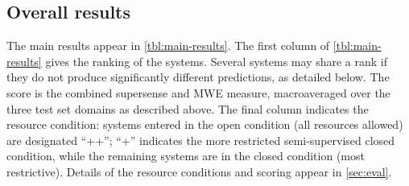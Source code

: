 \documentclass[11pt,letterpaper]{article}
\begin{document}
\subsection{Overall results}\label{sec:overall}
The main results appear in \cref{tbl:main-results}. 
The first column of \cref{tbl:main-results} gives the ranking of the systems. 
Several systems may share a rank if they do not produce significantly different predictions, as detailed below. 
The score is the combined supersense and MWE measure, macroaveraged over the three test set domains 
as described above. 
The final column indicates the resource condition:
systems entered in the open condition (all resources allowed) are designated ``++''; 
``+'' indicates the more restricted semi-supervised closed condition,  
while the remaining systems are in the closed condition (most restrictive). 
Details of the resource conditions and scoring appear in \cref{sec:eval}.
\end{document}

